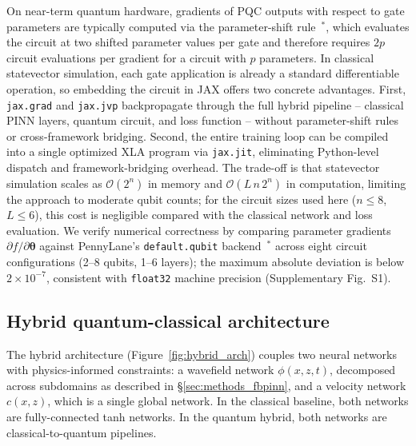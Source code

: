 \documentclass[11pt,a4paper]{article}
\newcommand{\newcite}[1]{\textcolor{todoRed}{$^{\ast}$}\citep{#1}}
\begin{document}
On near-term quantum hardware, gradients of PQC outputs with respect to gate parameters are typically computed via the parameter-shift rule~\newcite{mitarai2018quantum,schuld2019evaluating}, which evaluates the circuit at two shifted parameter values per gate and therefore requires $2p$ circuit evaluations per gradient for a circuit with $p$ parameters. In classical statevector simulation, each gate application is already a standard differentiable operation, so embedding the circuit in JAX offers two concrete advantages. First, \texttt{jax.grad} and \texttt{jax.jvp} backpropagate through the full hybrid pipeline -- classical PINN layers, quantum circuit, and loss function -- without parameter-shift rules or cross-framework bridging. Second, the entire training loop can be compiled into a single optimized XLA program via \texttt{jax.jit}, eliminating Python-level dispatch and framework-bridging overhead. The trade-off is that statevector simulation scales as $\mathcal{O}(2^n)$ in memory and $\mathcal{O}(L\,n\,2^n)$ in computation, limiting the approach to moderate qubit counts; for the circuit sizes used here ($n \leq 8$, $L \leq 6$), this cost is negligible compared with the classical network and loss evaluation. We verify numerical correctness by comparing parameter gradients $\partial f/\partial\boldsymbol{\theta}$ against PennyLane's \texttt{default.qubit} backend~\newcite{bergholm2018pennylane} across eight circuit configurations (2--8 qubits, 1--6 layers); the maximum absolute deviation is below $2\times 10^{-7}$, consistent with \texttt{float32} machine precision (Supplementary Fig.~S1).

\subsection{Hybrid quantum-classical architecture}\label{sec:hybrid_network}

The hybrid architecture (Figure~\ref{fig:hybrid_arch}) couples two neural networks with physics-informed constraints: a wavefield network $\phi(x,z,t)$, decomposed across subdomains as described in \S\ref{sec:methods_fbpinn}, and a velocity network $c(x,z)$, which is a single global network. In the classical baseline, both networks are fully-connected tanh networks. In the quantum hybrid, both networks are classical-to-quantum pipelines.
\end{document}
